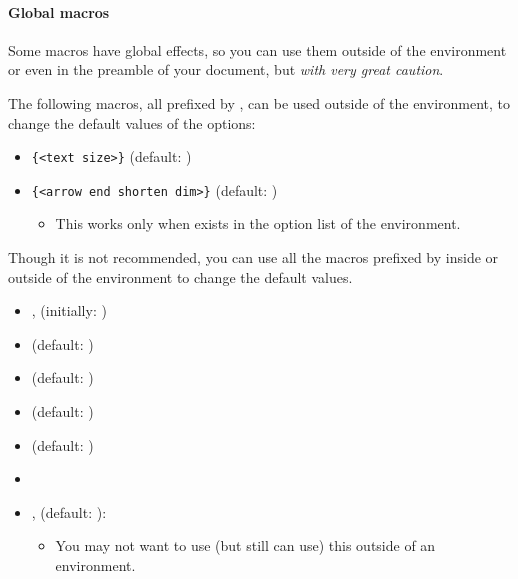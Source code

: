 \paragraph{Global macros}

Some macros have global effects, so you can use them outside of the  environment or even in the preamble of your document, but \emph{with very great caution}.

The following macros, all prefixed by , can be used outside of the  environment, to change the default values of the options:

\begin{itemize}\tightlist
\item \icmd{\setistgamefontsize}\verb+{<text size>}+ \hfill (default: \cmd{\normalsize})
\item \icmd{\setistgameshorten}\verb+{<arrow end shorten dim>}+ \hfill (default: \xw{0pt})
  \begin{itemize}
  \item This works only when \xw{->} exists in the option list of the  environment.
  \end{itemize}
\end{itemize}

Though it is not recommended, you can use all the macros prefixed by  inside or outside of the  environment to change the default values.

\begin{itemize}\tightlist
\item \icmd{\setistmathTF}, \icmd{\setistmathTF*} \hfill (initially: )
\item \icmd{\setistdefaultnodeinnersep} \hfill (default: \xw{1pt})
\item \icmd{\setistdefaultnodeoutersep} \hfill (default: \xw{0pt})
\item \icmd{\setistdefaultnodedrawcolor} \hfill (default: )
\item \icmd{\setistdefaultnodefillcolor} \hfill (default: )
\item {}
\item \icmd{\setistgrowdirection},  \hfill (default: ): 
  \begin{itemize}
  \item You may not want to use (but still can use) this outside of an  environment.
  \end{itemize}
\end{itemize}

